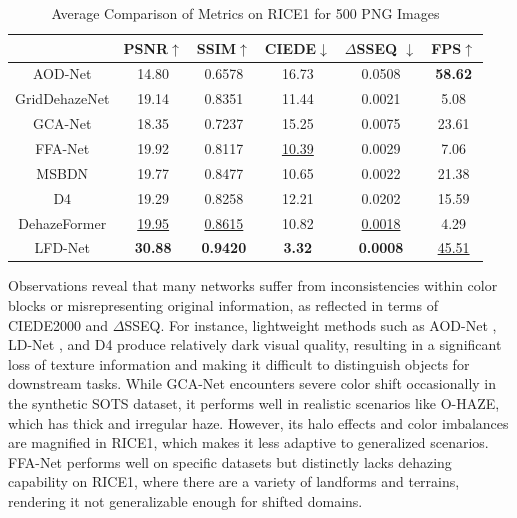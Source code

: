 \documentclass[lettersize,journal]{IEEEtran}
\begin{document}
\begin{table}[H]
    \caption{Average Comparison of Metrics on RICE1 for 500 PNG Images\label{tab:rice}}
    \centering
    \begin{tabular}{cccccc}
    \hline
    &PSNR$\uparrow$ & SSIM$\uparrow$ & CIEDE$\downarrow$ & $\Delta$SSEQ $\downarrow$ & FPS$\uparrow$ \\
    \hline
    AOD-Net       & 14.80 & 0.6578 & 16.73 & 0.0508 & \textbf{58.62} \\
    GridDehazeNet & 19.14 & 0.8351 & 11.44 & 0.0021 & 5.08 \\
    GCA-Net       & 18.35 & 0.7237 & 15.25 & 0.0075 & 23.61 \\    
    FFA-Net       & 19.92 & 0.8117 & \underline{10.39} & 0.0029 & 7.06 \\
    MSBDN         & 19.77 & 0.8477 & 10.65 & 0.0022 & 21.38 \\ %
    D4            & 19.29 & 0.8258 & 12.21 & 0.0202 & 15.59\\
    DehazeFormer  & \underline{19.95} & \underline{0.8615} & 10.82 & \underline{0.0018} & 4.29 \\ %
    LFD-Net       & \textbf{30.88} & \textbf{0.9420} & \textbf{3.32} & \textbf{0.0008} & \underline{45.51} \\
    \hline
    \end{tabular}
\end{table}

Observations reveal that many networks suffer from inconsistencies within color blocks or misrepresenting original information, as reflected in terms of CIEDE2000 and $\Delta$SSEQ. For instance, lightweight methods such as AOD-Net \cite{li2017aod}, LD-Net \cite{ullah2021light}, and D4 \cite{yang2022d4} produce relatively dark visual quality, resulting in a significant loss of texture information and making it difficult to distinguish objects for downstream tasks. While GCA-Net \cite{chen2019gated} encounters severe color shift occasionally in the synthetic SOTS dataset, it performs well in realistic scenarios like O-HAZE, which has thick and irregular haze. However, its halo effects and color imbalances are magnified in RICE1, which makes it less adaptive to generalized scenarios. FFA-Net \cite{qin2020ffa} performs well on specific datasets but distinctly lacks dehazing capability on RICE1, where there are a variety of landforms and terrains, rendering it not generalizable enough for shifted domains. 
\end{document}
